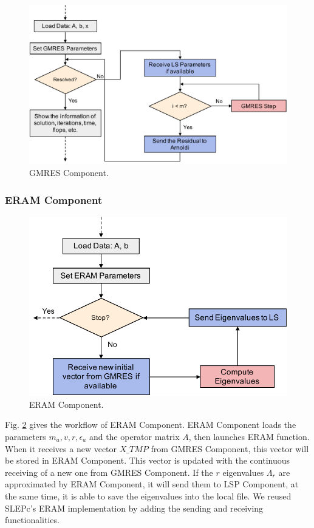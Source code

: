 \begin{figure}[t]
	\centering
	\includegraphics[width=0.99\linewidth]{fig/GMRES-component.pdf}
	\caption{GMRES Component.}
	\label{gmres-component}
\end{figure}

\subsubsection{ERAM Component}

\begin{figure}[t]
	\centering
	\includegraphics[width=0.8\linewidth]{fig/ERAM-component.pdf}
	\caption{ERAM Component.}
	\label{eram-component}
\end{figure}

Fig. \ref{eram-component} gives the workflow of ERAM Component. ERAM Component loads the parameters $m_a, v, r, \epsilon_a$ and the operator matrix $A$, then launches ERAM function. When it receives a new vector $X\_TMP$ from GMRES Component, this vector will be stored in ERAM Component. This vector is updated with the continuous receiving of a new one from GMRES Component. If the $r$ eigenvalues $\Lambda_r$ are approximated by ERAM Component, it will send them to LSP Component, at the same time, it is able to save the eigenvalues into the local file. We reused SLEPc's ERAM implementation by adding the sending and receiving functionalities.

